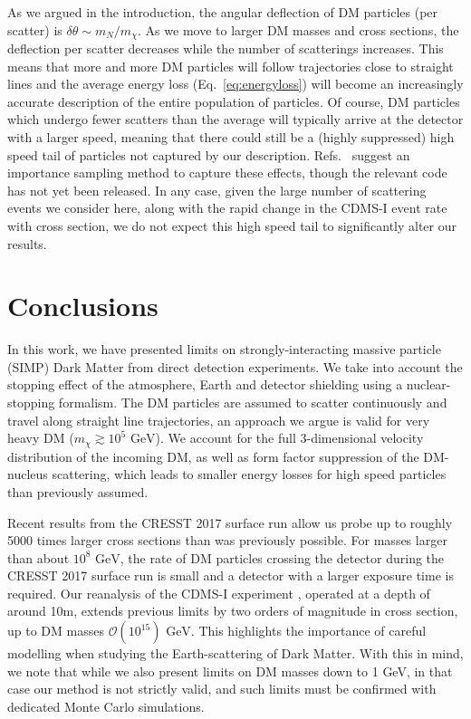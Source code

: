 \documentclass[prd,twocolumn,showpacs,nofootinbib,aps]{revtex4-1}
\begin{document}
As we argued in the introduction, the  angular deflection of DM particles (per scatter) is $\delta \theta \sim m_N/m_\chi$. As we move to larger DM masses and cross sections, the deflection per scatter decreases while the number of scatterings increases. This means that more and more DM particles will follow trajectories close to straight lines and the average energy loss (Eq.~\eqref{eq:energyloss}) will become an increasingly accurate description of the entire population of particles. Of course, DM particles which undergo fewer scatters than the average will typically arrive at the detector with a larger speed, meaning that there could still be a (highly suppressed) high speed tail of particles not captured by our description. Refs.~ \cite{Mahdawi:2017cxz,Mahdawi:2017utm} suggest an importance sampling method to capture these effects, though the relevant code has not yet been released. In any case, given the large number of scattering events we consider here, along with the rapid change in the CDMS-I event rate with cross section, we do not expect this high speed tail to significantly alter our results.

\section{Conclusions}

In this work, we have presented limits on strongly-interacting massive particle (SIMP) Dark Matter from direct detection experiments. We take into account the stopping effect of the atmosphere, Earth and detector shielding using a nuclear-stopping formalism. The DM particles are assumed to scatter continuously and travel along straight line trajectories, an approach we argue is valid for very heavy DM ($m_\chi \gtrsim 10^5 \,\,\mathrm{GeV}$). We account for the full 3-dimensional velocity distribution of the incoming DM, as well as form factor suppression of the DM-nucleus scattering, which leads to smaller energy losses for high speed particles than previously assumed. 

Recent results from the CRESST 2017 surface run \cite{Angloher:2017sxg} allow us probe up to roughly 5000 times larger cross sections than was previously possible. For masses larger than about $10^{8}\,\,\mathrm{GeV}$, the rate of DM particles crossing the detector during the CRESST 2017 surface run is small and a detector with a larger exposure time is required. Our reanalysis of the CDMS-I experiment \cite{Abusaidi:2000wg,Abrams:2002nb}, operated at a depth of around 10m, extends previous limits \cite{Albuquerque:2003ei} by two orders of magnitude in cross section, up to DM masses $\mathcal{O}(10^{15})\,\,\mathrm{GeV}$. This highlights the importance of careful modelling when studying the Earth-scattering of Dark Matter. With this in mind, we note that while we also present limits on DM masses down to 1 GeV, in that case our method is not strictly valid, and such limits must be confirmed with dedicated Monte Carlo simulations. 
\end{document}
